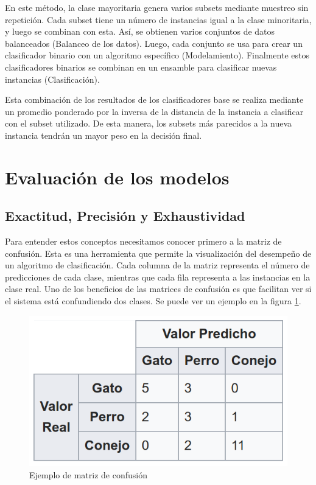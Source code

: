 En este método, la clase mayoritaria genera varios subsets mediante muestreo sin repetición. Cada subset tiene un número de instancias igual a la clase minoritaria, y luego se combinan con esta. Así, se obtienen varios conjuntos de datos balanceados (Balanceo de los datos). Luego, cada conjunto se usa para crear un clasificador binario con un algoritmo específico (Modelamiento). Finalmente estos clasificadores binarios se combinan en un ensamble para clasificar nuevas instancias (Clasificación).

Esta combinación de los resultados de los clasificadores base se realiza mediante un promedio ponderado por la inversa de la distancia de la instancia a clasificar con el subset utilizado. De esta manera, los subsets más parecidos a la nueva instancia tendrán un mayor peso en la decisión final.


\section{Evaluación de los modelos}

\subsection{Exactitud, Precisión y Exhaustividad}

Para entender estos conceptos necesitamos conocer primero a la matriz de confusión. Esta es una herramienta que permite la visualización del desempeño de un algoritmo de clasificación. Cada columna de la matriz representa el número de predicciones de cada clase, mientras que cada fila representa a las instancias en la clase real. Uno de los beneficios de las matrices de confusión es que facilitan ver si el sistema está confundiendo dos clases. Se puede ver un ejemplo en la figura \ref{fig:confussion}.

\begin{figure}
    \centering
    \caption{Ejemplo de matriz de confusión}
    \label{fig:confussion}
    \includegraphics[width=0.5\linewidth]{graficos/confussion_matrix.png}
\end{figure}

